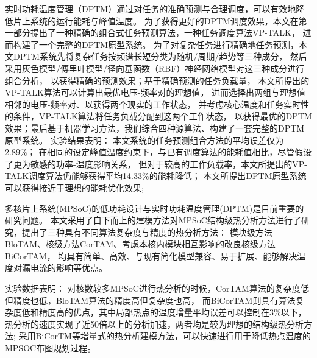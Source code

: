 

{}

\makeatother



\begin{cabstract}

  实时功耗温度管理（DPTM）通过对任务的准确预测与合理调度，可以有效地降低片上系统的运行能耗与峰值温度。 为了获得更好的DPTM调度效果，本文在第一部分提出了一种精确的组合式任务预测算法，一种任务调度算法VP-TALK， 进而构建了一个完整的DPTM原型系统。 为了对复杂任务进行精确地任务预测，本文DPTM系统先将复杂任务按频谱长短分类为随机/周期/趋势等三种成分， 然后采用灰色模型/傅里叶模型/径向基函数（RBF）神经网络模型对这三种成分进行组合分析， 以获得精确的预测效果；基于精确预测的任务负载量， 本文所提出的VP-TALK算法可以计算出最优电压-频率对的理想值， 进而选择出两组与理想值相邻的电压-频率对、以获得两个现实的工作状态， 并考虑核心温度和任务实时性的条件，VP-TALK算法将任务负载分配到这两个工作状态， 以获得最优的DPTM效果；最后基于机器学习方法，我们综合四种源算法、构建了一套完整的DPTM原型系统。
  实验结果表明：
  本文系统的任务预测组合方法的平均误差仅为2.89\%；
  在相同的设定峰值温度约束下，与已有调度算法的能耗值相比，尽管假设了更为敏感的功率-温度影响关系， 但对于较高的工作负载率，本文所提出的VP-TALK调度算法仍能够获得平均14.33\%的能耗降低；
  本文所提出DPTM原型系统可以获得接近于理想的能耗优化效果;


  多核片上系统(MPSoC)的低功耗设计与实时功耗温度管理(DPTM)是目前重要的研究问题。 本文采用了自下而上的建模方法对MPSoC结构级热分析方法进行了研究，提出了三种具有不同算法复杂度与精度的热分析方法： 模块级方法BloTAM、核级方法CorTAM、考虑本核内模块相互影响的改良核级方法BiCorTAM， 均具有简单、高效、与现有简化模型兼容、易于扩展、能够解决温度对漏电流的影响等优点。

  实验数据表明：
  对核数较多MPSoC进行热分析的时候，CorTAM算法的复杂度低但精度也低，BloTAM算法的精度高但复杂度也高， 而BiCorTAM则具有算法复杂度低和精度高的优点，其中局部热点的温度增量平均误差可以控制在3\%以下， 热分析的速度实现了近50倍以上的分析加速，两者均是较为理想的结构级热分析方法;
  采用BiCorTM等增量式的热分析建模方法，可以快速进行用于降低热点温度的MPSOC布图规划过程。


\end{cabstract}


